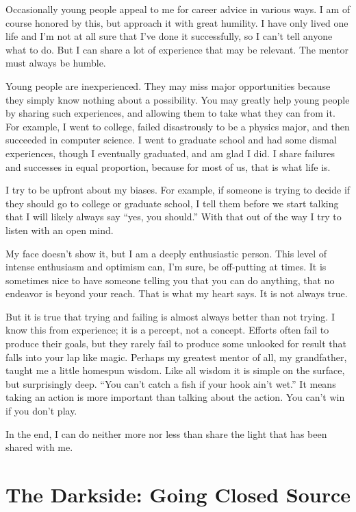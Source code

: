 \documentclass[
	fontsize=10pt, %
	twoside=false, %
	secnumdepth=1, %
]{kaobook}
\begin{document}
Occasionally young people appeal to me for career advice in various
ways. I am of course honored by this, but approach it with great
humility. I have only lived one life and I’m not at all sure that I’ve
done it successfully, so I can’t tell anyone what to do. But I can
share a lot of experience that may be relevant. The mentor must always
be humble.

Young people are inexperienced. They may miss major opportunities
because they simply know nothing about a possibility. You may greatly
help young people by sharing such experiences, and allowing them to
take what they can from it. For example, I went to college, failed
disastrously to be a physics major, and then succeeded in computer
science. I went to graduate school and had some dismal experiences,
though I eventually graduated, and am glad I did. I share failures and
successes in equal proportion, because for most of us, that is what
life is.

I try to be upfront about my biases. For example, if someone is trying
to decide if they should go to college or graduate school, I tell them
before we start talking that I will likely always say “yes, you
should.” With that out of the way I try to listen with an open mind.

My face doesn’t show it, but I am a deeply enthusiastic person. This
level of intense enthusiasm and optimism can, I’m sure, be off-putting
at times. It is sometimes nice to have someone telling you that you
can do anything, that no endeavor is beyond your reach. That is what
my heart says. It is not always true.

But it is true that trying and failing is almost always better than
not trying. I know this from experience; it is a percept, not a
concept. Efforts often fail to produce their goals, but they rarely
fail to produce some unlooked for result that falls into your lap like
magic. Perhaps my greatest mentor of all, my grandfather, taught me a
little homespun wisdom. Like all wisdom it is simple on the surface,
but surprisingly deep. “You can’t catch a fish if your hook ain’t
wet.” It means taking an action is more important than talking about
the action. You can’t win if you don’t play.

In the end, I can do neither more nor less than share the light that
has been shared with me.


\section{The Darkside: Going Closed Source}
\end{document}
